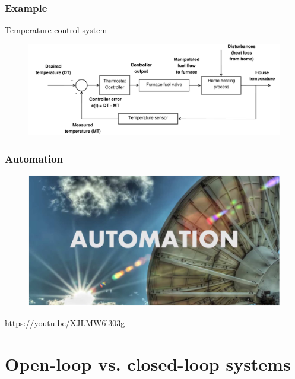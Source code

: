\documentclass{beamer}
\begin{document}
\begin{frame}
\frametitle{Example}
\vspace{-6ex}
Temperature control system\\
\bigskip
\begin{figure}
\includegraphics[width=1\linewidth]{temp_control_system}
\end{figure}
\end{frame}


\begin{frame}
\frametitle{Automation}
\begin{figure}
\includegraphics[width=1\linewidth]{automation}
\end{figure}
\url{https://youtu.be/XJLMW6l303g}
\end{frame}

\section{Open-loop vs. closed-loop systems} 
\end{document}
